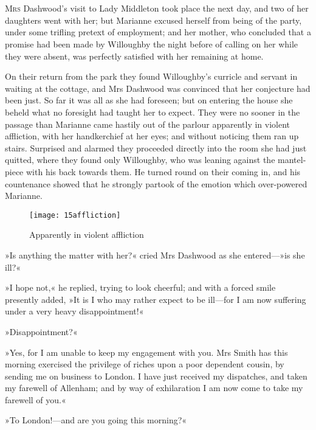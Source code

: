 \chapter[Chapter \thechapter]{}
\lettrine[lines=4,lraise=0.3]{M}{rs} Dashwood’s visit to Lady Middleton took place the next day, and two of her daughters went with her; but Marianne excused herself from being of the party, under some trifling pretext of employment; and her mother, who concluded that a promise had been made by Willoughby the night before of calling on her while they were absent, was perfectly satisfied with her remaining at home.

On their return from the park they found Willoughby’s curricle and servant in waiting at the cottage, and Mrs Dashwood was convinced that her conjecture had been just. So far it was all as she had foreseen; but on entering the house she beheld what no foresight had taught her to expect. They were no sooner in the passage than Marianne came hastily out of the parlour apparently in violent affliction, with her handkerchief at her eyes; and without noticing them ran up stairs. Surprised and alarmed they proceeded directly into the room she had just quitted, where they found only Willoughby, who was leaning against the mantel-piece with his back towards them. He turned round on their coming in, and his countenance showed that he strongly partook of the emotion which over-powered Marianne.

\begin{figure}[tbph]
\centering
\texttt{[image: 15affliction]}
\caption{Apparently in violent affliction}
\end{figure}

»Is anything the matter with her?« cried Mrs Dashwood as she entered—»is she ill?«

»I hope not,« he replied, trying to look cheerful; and with a forced smile presently added, »It is I who may rather expect to be ill—for I am now suffering under a very heavy disappointment!«

»Disappointment?«

»Yes, for I am unable to keep my engagement with you. Mrs Smith has this morning exercised the privilege of riches upon a poor dependent cousin, by sending me on business to London. I have just received my dispatches, and taken my farewell of Allenham; and by way of exhilaration I am now come to take my farewell of you.«

»To London!—and are you going this morning?«

